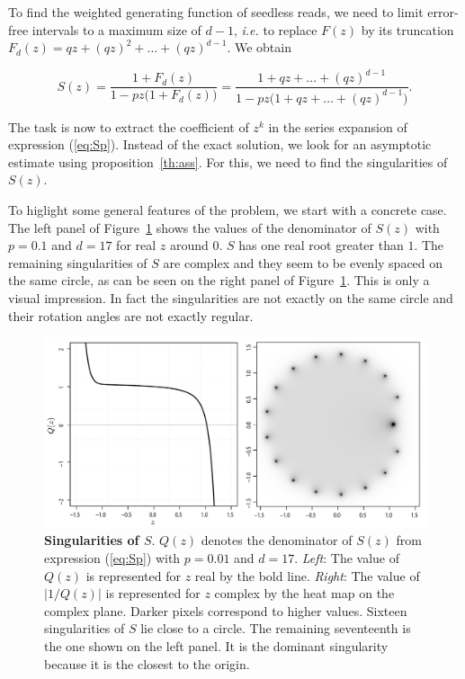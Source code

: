 \documentclass{article}
\begin{document}
To find the weighted generating function of seedless reads, we need to
limit error-free intervals to a maximum size of $d-1$, \textit{i.e.} to
replace $F(z)$ by its truncation $F_d(z) = qz + (qz)^2 + \ldots
+ (qz)^{d-1}$. We obtain

\begin{equation}
\label{eq:Sp}
S(z) = \frac{1+F_d(z)}{1-pz\big( 1+F_d(z) \big)} =
\frac{1+qz + \ldots + (qz)^{d-1}}{1-pz \big(1+qz + \ldots +
(qz)^{d-1} \big)}.
\end{equation}

The task is now to extract the coefficient of $z^k$ in the series
expansion of expression (\ref{eq:Sp}). Instead of the exact solution, we
look for an asymptotic estimate using proposition~\ref{th:ass}. For this,
we need to find the singularities of $S(z)$.

To higlight some general features of the problem, we start with a concrete
case. The left panel of Figure~\ref{fig:plotQ} shows the values of the
denominator of $S(z)$ with $p=0.1$ and $d=17$ for real $z$ around $0$. $S$
has one real root greater than $1$.  The remaining singularities of $S$
are complex and they seem to be evenly spaced on the same circle, as can
be seen on the right panel of Figure~\ref{fig:plotQ}.  This is only a
visual impression.  In fact the singularities are not exactly on the same
circle and their rotation angles are not exactly regular.

\begin{figure}[h]
\centering
\includegraphics[scale=0.4]{singularityS.pdf}
\caption{\textbf{Singularities of $S$}. $Q(z)$ denotes the
denominator of $S(z)$ from expression (\ref{eq:Sp}) with $p=0.01$ and
$d=17$. \textit{Left}: The value of $Q(z)$ is represented for $z$ real by
the bold line. \textit{Right}: The value of $|1/Q(z)|$ is represented for
$z$ complex by the heat map on the complex plane. Darker pixels correspond
to higher values. Sixteen singularities of $S$ lie close to a circle. The
remaining seventeenth is the one shown on the left panel. It is the
dominant singularity because it is the closest to the origin.}
\label{fig:plotQ}
\end{figure}
\end{document}
